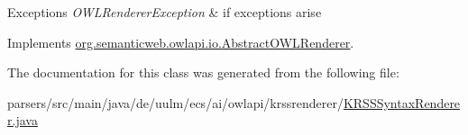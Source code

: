 \begin{DoxyExceptions}{Exceptions}
{\em O\-W\-L\-Renderer\-Exception} & if exceptions arise \\
\hline
\end{DoxyExceptions}


Implements \hyperlink{classorg_1_1semanticweb_1_1owlapi_1_1io_1_1_abstract_o_w_l_renderer_af63991e15c4b152e1f8013582c119bf5}{org.\-semanticweb.\-owlapi.\-io.\-Abstract\-O\-W\-L\-Renderer}.



The documentation for this class was generated from the following file\-:\begin{DoxyCompactItemize}
\item 
parsers/src/main/java/de/uulm/ecs/ai/owlapi/krssrenderer/\hyperlink{_k_r_s_s_syntax_renderer_8java}{K\-R\-S\-S\-Syntax\-Renderer.\-java}\end{DoxyCompactItemize}

